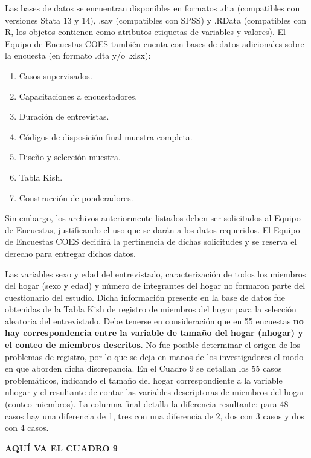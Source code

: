 \documentclass[
]{book}
\providecommand{\tightlist}{%
  \setlength{\itemsep}{0pt}\setlength{\parskip}{0pt}}
\begin{document}
Las bases de datos se encuentran disponibles en formatos .dta
(compatibles con versiones Stata 13 y 14), .sav (compatibles con SPSS) y
.RData (compatibles con R, los objetos contienen como atributos
etiquetas de variables y valores). El Equipo de Encuestas COES también
cuenta con bases de datos adicionales sobre la encuesta (en formato .dta
y/o .xlsx):

\begin{enumerate}
\def\labelenumi{\arabic{enumi}.}
\tightlist
\item
  Casos supervisados.
\item
  Capacitaciones a encuestadores.
\item
  Duración de entrevistas.
\item
  Códigos de disposición final muestra completa.
\item
  Diseño y selección muestra.
\item
  Tabla Kish.
\item
  Construcción de ponderadores.
\end{enumerate}

Sin embargo, los archivos anteriormente listados deben ser solicitados
al Equipo de Encuestas, justificando el uso que se darán a los datos
requeridos. El Equipo de Encuestas COES decidirá la pertinencia de
dichas solicitudes y se reserva el derecho para entregar dichos datos.

Las variables sexo y edad del entrevistado, caracterización de todos los
miembros del hogar (sexo y edad) y número de integrantes del hogar no
formaron parte del cuestionario del estudio. Dicha información presente
en la base de datos fue obtenidas de la Tabla Kish de registro de
miembros del hogar para la selección aleatoria del entrevistado. Debe
tenerse en consideración que en 55 encuestas \textbf{no hay
correspondencia entre la variable de tamaño del hogar (nhogar) y el
conteo de miembros descritos}. No fue posible determinar el origen de
los problemas de registro, por lo que se deja en manos de los
investigadores el modo en que aborden dicha discrepancia. En el Cuadro 9
se detallan los 55 casos problemáticos, indicando el tamaño del hogar
correspondiente a la variable nhogar y el resultante de contar las
variables descriptoras de miembros del hogar (conteo miembros). La
columna final detalla la diferencia resultante: para 48 casos hay una
diferencia de 1, tres con una diferencia de 2, dos con 3 casos y dos con
4 casos.

\textbf{AQUÍ VA EL CUADRO 9}

\backmatter
\end{document}
